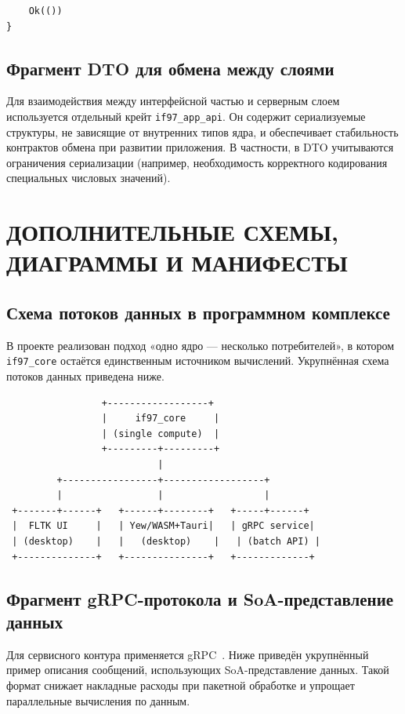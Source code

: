 \begin{appendices}
\begin{verbatim}
    Ok(())
}
\end{verbatim}

\section{Фрагмент DTO для обмена между слоями}

Для взаимодействия между интерфейсной частью и серверным слоем используется отдельный крейт \texttt{if97\_app\_api}.  
Он содержит сериализуемые структуры, не зависящие от внутренних типов ядра, и обеспечивает стабильность контрактов обмена при развитии приложения.  
В частности, в DTO учитываются ограничения сериализации (например, необходимость корректного кодирования специальных числовых значений).  

\chapter{ДОПОЛНИТЕЛЬНЫЕ СХЕМЫ, ДИАГРАММЫ И МАНИФЕСТЫ}

\section{Схема потоков данных в программном комплексе}

В проекте реализован подход «одно ядро --- несколько потребителей», в котором \texttt{if97\_core} остаётся единственным источником вычислений.  
Укрупнённая схема потоков данных приведена ниже.  

\begin{verbatim}
                 +------------------+
                 |     if97_core     |
                 | (single compute)  |
                 +---------+---------+
                           |
         +-----------------+------------------+
         |                 |                  |
 +-------+------+   +------+--------+   +-----+------+
 |  FLTK UI     |   | Yew/WASM+Tauri|   | gRPC service|
 | (desktop)    |   |   (desktop)    |   | (batch API) |
 +--------------+   +---------------+   +-------------+
\end{verbatim}

\section{Фрагмент gRPC-протокола и SoA-представление данных}

Для сервисного контура применяется gRPC~\cite{grpc_docs}.  
Ниже приведён укрупнённый пример описания сообщений, использующих SoA-представление данных.  
Такой формат снижает накладные расходы при пакетной обработке и упрощает параллельные вычисления по данным.  


\end{appendices}
